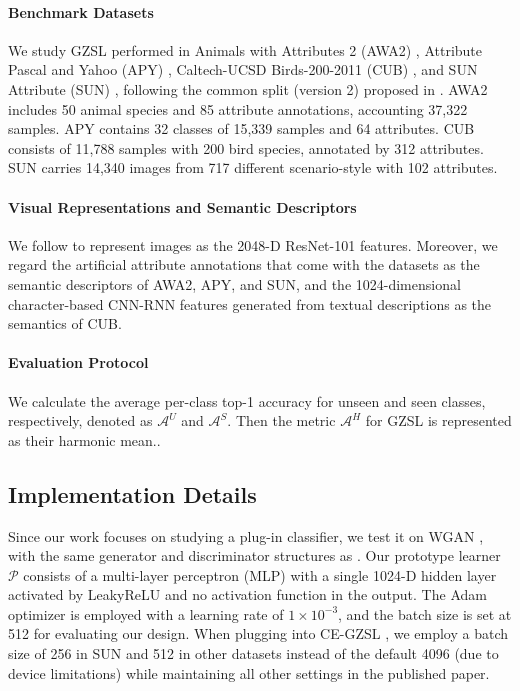 \documentclass{article}
\begin{document}
\paragraph{Benchmark Datasets}
We study GZSL performed in Animals with Attributes 2 (AWA2) \cite{lampert2013attribute}, Attribute Pascal and Yahoo (APY) \cite{farhadi2009describing}, Caltech-UCSD Birds-200-2011 (CUB) \cite{wah2011caltech}, and SUN Attribute (SUN) \cite{patterson2012sun}, following the common split (version 2) proposed in \cite{xian2017zero}. AWA2 includes 50 animal species and 85 attribute annotations, accounting 37,322 samples. APY contains 32 classes of 15,339 samples and 64 attributes. CUB consists of 11,788 samples with 200 bird species, annotated by 312 attributes. SUN carries 14,340 images from 717 different scenario-style with 102 attributes.
	
\paragraph{Visual Representations and Semantic Descriptors}
We follow \cite{xian2017zero} to represent images as the 2048-D ResNet-101 \cite{he2016deep} features. Moreover, we regard the artificial attribute annotations that come with the datasets as the semantic descriptors of AWA2, APY, and SUN, and the 1024-dimensional character-based CNN-RNN features \cite{reed2016learning} generated from textual descriptions as the semantics of CUB.
	
\paragraph{Evaluation Protocol}
We calculate the average per-class top-1 accuracy for unseen and seen classes, respectively, denoted as $\mathcal{A}^U$ and $\mathcal{A}^S$. Then the metric $\mathcal{A}^H$ for GZSL is represented as their harmonic mean.\cite{xian2017zero}.
	
	\subsection{Implementation Details}
	Since our work focuses on studying a plug-in classifier, we test it on WGAN \cite{gulrajani2017improved}, with the same generator and discriminator structures as \cite{xian2018feature}. Our prototype learner $\mathcal{P}$ consists of a multi-layer perceptron (MLP) with a single 1024-D hidden layer activated by LeakyReLU and no activation function in the output. The Adam optimizer is employed with a learning rate of $1\times10^{-3}$, and the batch size is set at 512 for evaluating our design. When plugging into CE-GZSL \cite{han2021contrastive}, we employ a batch size of 256 in SUN and 512 in other datasets instead of the default 4096 (due to device limitations) while maintaining all other settings in the published paper.
\end{document}
